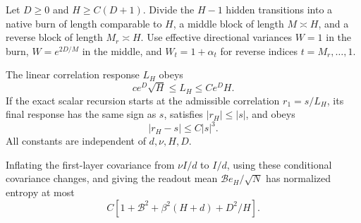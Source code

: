 \begin{lemma}
\label{lem:dimension-uniform-schedule}
Let $D\ge0$ and $H\ge C(D+1)$. Divide the $H-1$ hidden transitions into a native burn of length comparable to $H$, a middle block of length $M\asymp H$, and a reverse block of length $M_r\asymp H$. Use effective directional variances $W=1$ in the burn, $W=e^{2D/M}$ in the middle, and $W_t=1+\alpha_t$ for reverse indices $t=M_r,\ldots,1$.

The linear correlation response $L_H$ obeys
\[
 ce^D\sqrt H\le L_H\le Ce^DH.
\]
If the exact scalar recursion starts at the admissible correlation $r_1=s/L_H$, its final response has the same sign as $s$, satisfies $|r_H|\le|s|$, and obeys
\[
 |r_H-s|\le C|s|^3.
\]
All constants are independent of $d,\nu,H,D$.

Inflating the first-layer covariance from $\nu I/d$ to $I/d$, using these conditional covariance changes, and giving the readout mean $\mathcal B e_H/\sqrt N$ has normalized entropy at most
\[
 C\left[1+\mathcal B^2+\beta^2(H+d)+D^2/H\right].
 \label{eq:dimension-uniform-action}
\]
\end{lemma}
